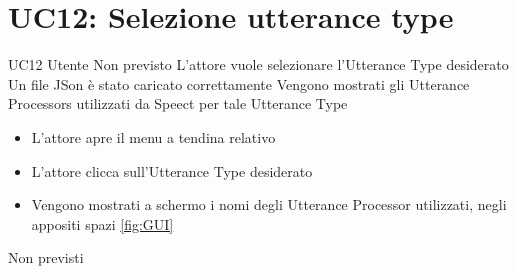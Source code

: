 \documentclass[../AnalisideiRequisiti.tex]{subfiles}
\begin{document}
\section{UC12: Selezione utterance type}
\UserCase
{UC12}
{Utente}
{Non previsto}
{L'attore vuole selezionare l'Utterance Type desiderato}
{Un file JSon è stato caricato correttamente }
{Vengono mostrati gli Utterance Processors utilizzati da Speect per tale Utterance Type}
{
	\begin{itemize}
		\item{} L'attore apre il menu a tendina relativo
		\item{} L'attore clicca sull'Utterance Type desiderato
		\item{} Vengono mostrati a schermo i nomi degli Utterance Processor utilizzati, negli appositi spazi \ref{fig:GUI}		
	\end{itemize}
}
{Non previsti}
\end{document}
